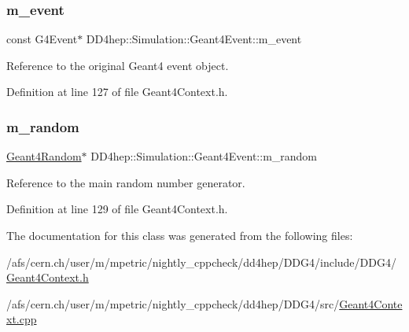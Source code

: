 \subsubsection{\texorpdfstring{m\+\_\+event}{m\_event}}
{\footnotesize\ttfamily const G4\+Event$\ast$ D\+D4hep\+::\+Simulation\+::\+Geant4\+Event\+::m\+\_\+event\hspace{0.3cm}{\ttfamily [private]}}



Reference to the original Geant4 event object. 



Definition at line 127 of file Geant4\+Context.\+h.

\hypertarget{class_d_d4hep_1_1_simulation_1_1_geant4_event_a0eb7e282d0f186db2a738cc3ac9e1718}{}\label{class_d_d4hep_1_1_simulation_1_1_geant4_event_a0eb7e282d0f186db2a738cc3ac9e1718} 
\subsubsection{\texorpdfstring{m\+\_\+random}{m\_random}}
{\footnotesize\ttfamily \hyperlink{class_d_d4hep_1_1_simulation_1_1_geant4_random}{Geant4\+Random}$\ast$ D\+D4hep\+::\+Simulation\+::\+Geant4\+Event\+::m\+\_\+random\hspace{0.3cm}{\ttfamily [private]}}



Reference to the main random number generator. 



Definition at line 129 of file Geant4\+Context.\+h.



The documentation for this class was generated from the following files\+:\begin{DoxyCompactItemize}
\item 
/afs/cern.\+ch/user/m/mpetric/nightly\+\_\+cppcheck/dd4hep/\+D\+D\+G4/include/\+D\+D\+G4/\hyperlink{_geant4_context_8h}{Geant4\+Context.\+h}\item 
/afs/cern.\+ch/user/m/mpetric/nightly\+\_\+cppcheck/dd4hep/\+D\+D\+G4/src/\hyperlink{_geant4_context_8cpp}{Geant4\+Context.\+cpp}\end{DoxyCompactItemize}

